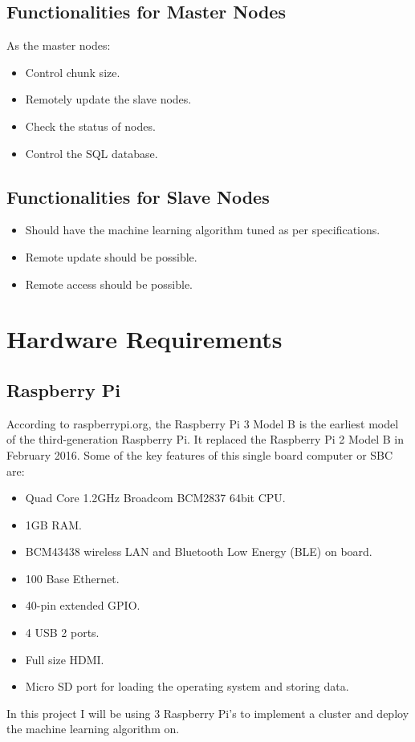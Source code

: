\documentclass[12pt]{article}
\begin{document}
\subsection{Functionalities for Master Nodes}
As the master nodes:
\begin{itemize}
\item Control chunk size.
\item Remotely update the slave nodes.
\item Check the status of nodes.
\item Control the SQL database.
\end{itemize}

\subsection{Functionalities for Slave Nodes}
\begin{itemize}
\item Should have the machine learning algorithm tuned as per specifications.
\item Remote update should be possible.
\item Remote access should be possible.
\end{itemize}

\newpage
\section{Hardware Requirements}
\subsection{Raspberry Pi}

According to raspberrypi.org, the Raspberry Pi 3 Model B is the earliest model of the third-generation Raspberry Pi. It replaced the Raspberry Pi 2 Model B in February 2016. Some of the key features of this single board computer or SBC are:
\begin{itemize}
\item Quad Core 1.2GHz Broadcom BCM2837 64bit CPU.
\item 1GB RAM.
\item BCM43438 wireless LAN and Bluetooth Low Energy (BLE) on board.
\item 100 Base Ethernet.
\item 40-pin extended GPIO.
\item 4 USB 2 ports.
\item Full size HDMI.
\item Micro SD port for loading the operating system and storing data.
\end{itemize}
In this project I will be using 3 Raspberry Pi's to implement a cluster and deploy the machine learning algorithm on.
\end{document}
